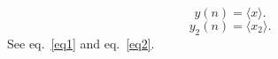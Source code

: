 \documentclass[10pt]{book}
\begin{document}
\begin{equation} %
y(n) = \langle x\rangle. %
\label{eq1}
\end{equation} %
\begin{equation} %
y_2(n) 
\label{eq2}
= \langle x_2\rangle. %
\end{equation} %
See eq.~\ref{eq1} and eq.~\ref{eq2}.
\end{document}
